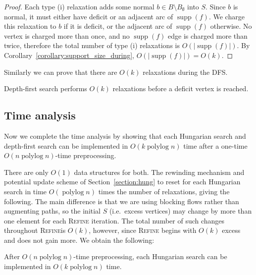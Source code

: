 \documentclass[a4paper,UKenglish]{socg-lipics-v2018}
\def\polylog{\mathop{\mathrm{polylog}}}
\def\supp{\operatorname{supp}}
\theoremstyle{plain}
\numberwithin{figure}{section}
\begin{document}
\begin{toappendix}
\begin{proof}
Each type (i) relaxation adds some normal $b \in B \setminus B_\emptyset$
into $S$.
Since $b$ is normal, it must either have deficit or an adjacent arc of
$\supp(f)$.
We charge this relaxation to $b$ if it is deficit, or the adjacent arc of
$\supp(f)$ otherwise.
No vertex is charged more than once, and no $\supp(f)$ edge is charged more
than twice, therefore the total number of type (i) relaxations is
$O(|\supp(f)|)$.
By Corollary~\ref{corollary:support_size_during}, $O(|\supp(f)|) = O(k)$.
\end{proof}

Similarly we can prove that there are $O(k)$ relaxations during the DFS.

\begin{corollary}
\label{corollary:goldberg_dfs_length}
Depth-first search performs $O(k)$ relaxations before a deficit vertex is reached.
\end{corollary}



\subsection{Time analysis}
\label{SSA:time-ananlsis}

Now we complete the time analysis by showing that each Hungarian search and
depth-first search can be implemented in $O(k \polylog n)$ time after a
one-time $O(n \polylog n)$-time preprocessing.

There are only $O(1)$ data structures for both.
The rewinding mechanism and potential update scheme of
Section~\ref{section:hung} to reset for each Hungarian search in
time $O(\polylog n)$ times the number of relaxations, giving the following.
The main difference is that we are using blocking flows rather than augmenting
paths, so the initial $S$ (i.e.\ excess vertices) may change by more than
one element for each \textsc{Refine} iteration.
The total number of such changes throughout \textsc{Refine}is $O(k)$, however,
since \textsc{Refine} begins with $O(k)$ excess and does not gain more.
We obtain the following:

\begin{lemmarep}
\label{lemma:goldberg_hs_time}
After $O(n \polylog n)$-time preprocessing,
each Hungarian search can be implemented in $O(k \polylog n)$ time.
\end{lemmarep}


\end{toappendix}
\end{document}
